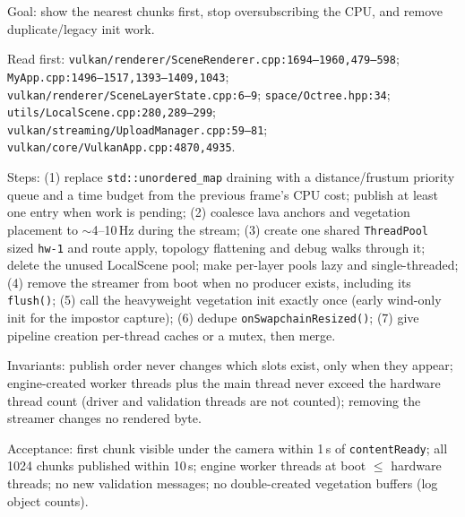 \documentclass[11pt,a4paper]{article}
\begin{document}
\begin{tcolorbox}[promptbox={Prompt 4 --- Priority publish, thread budget, and cleanup}]
Goal: show the nearest chunks first, stop oversubscribing the CPU, and remove
duplicate/legacy init work.

Read first: \texttt{vulkan/\allowbreak renderer/\allowbreak SceneRenderer.cpp:1694--1960,479--598};
\texttt{MyApp.cpp:1496--1517,1393--1409,1043};
\texttt{vulkan/\allowbreak renderer/\allowbreak SceneLayerState.cpp:6--9};
\texttt{space/\allowbreak Octree.hpp:34}; \texttt{utils/\allowbreak LocalScene.cpp:280,289--299};
\texttt{vulkan/\allowbreak streaming/\allowbreak UploadManager.cpp:59--81};
\texttt{vulkan/\allowbreak core/\allowbreak VulkanApp.cpp:4870,4935}.

Steps: (1) replace \texttt{std::unordered\_map} draining with a
distance/frustum priority queue and a time budget from the previous frame's
CPU cost; publish at least one entry when work is pending; (2) coalesce lava
anchors and vegetation placement to $\sim$4--10\,Hz during the stream;
(3) create one shared \texttt{ThreadPool} sized \texttt{hw-1} and route
apply, topology flattening and debug walks through it; delete the unused
LocalScene pool; make per-layer pools lazy and single-threaded; (4) remove
the streamer from boot when no producer exists, including its
\texttt{flush()}; (5) call the heavyweight vegetation init exactly once
(early wind-only init for the impostor capture); (6) dedupe
\texttt{onSwapchainResized()}; (7) give pipeline creation per-thread caches
or a mutex, then merge.

Invariants: publish order never changes which slots exist, only when they
appear; engine-created worker threads plus the main thread never exceed the
hardware thread count (driver and validation threads are not counted);
removing the streamer changes no rendered byte.

Acceptance: first chunk visible under the camera within 1\,s of
\texttt{contentReady}; all 1024 chunks published within 10\,s; engine worker
threads at boot $\le$ hardware threads; no new validation messages; no
double-created vegetation buffers (log object counts).
\end{tcolorbox}
\end{document}
